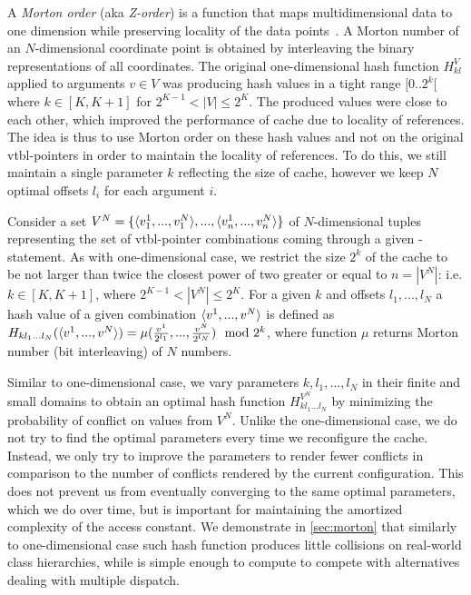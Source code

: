 A \emph{Morton order} (aka \emph{Z-order}) is a function that 
maps multidimensional data to one dimension while preserving locality of the 
data points~\cite{Morton66}. A Morton number of an $N$-dimensional coordinate 
point is obtained by interleaving the binary representations of all coordinates.
The original one-dimensional hash function $H_{kl}^V$ applied to arguments $v \in V$ 
was producing hash values in a tight range $[0..2^k[$ where $k \in [K,K+1]$ for 
$2^{K-1} < |V| \leq 2^K$. The produced values were close to each other, which 
improved the performance of cache due to locality of references. The 
idea is thus to use Morton order on these hash values and not on the original 
vtbl-pointers in order to maintain the locality of references. To do this, we 
still maintain a single parameter $k$ reflecting the size of cache, however we 
keep $N$ optimal offsets $l_i$ for each argument $i$.

Consider a set $V^N = \{\langle v_1^1,...,v_1^N\rangle,...,\langle v_n^1,...,v_n^N\rangle\}$ of 
$N$-dimensional tuples representing the set of vtbl-pointer combinations coming 
through a given -statement. As with one-dimensional case, we 
restrict the size $2^k$ of the cache to be not larger than twice the closest 
power of two greater or equal to $n=|V^N|$: i.e. $k \in [K,K+1]$, where 
$2^{K-1} < |V^N| \leq 2^K$. For a given $k$ and offsets $l_1,...,l_N$ a hash 
value of a given combination $\langle v^1,...,v^N\rangle$ is defined as 
$H_{kl_1...l_N}(\langle v^1,...,v^N\rangle)=\mu(\frac{v^1}{2^{l_1}},...,\frac{v^N}{2^{l_N}}) \mod 2^k$, 
where function $\mu$ returns Morton number (bit interleaving) of $N$ numbers.
 
Similar to one-dimensional case, we vary parameters $k,l_1,...,l_N$ in 
their finite and small domains to obtain an optimal hash function 
$H^{V^N}_{kl_1...l_N}$ by minimizing the probability of conflict on values from 
$V^N$. Unlike the one-dimensional case, we do not try to find the optimal 
parameters every time we reconfigure the cache. Instead, we only try to improve 
the parameters to render fewer conflicts in comparison to the number of conflicts 
rendered by the current configuration. This does not prevent us from eventually 
converging to the same optimal parameters, which we do over time, but is 
important for maintaining the amortized complexity of the access constant. 
We demonstrate in \textsection\ref{sec:morton} that similarly to one-dimensional 
case such hash function produces little collisions on real-world class 
hierarchies, while is simple enough to compute to compete with alternatives 
dealing with multiple dispatch.

